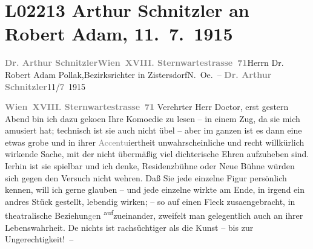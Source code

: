 

\section[Arthur Schnitzler an Robert Adam, 11. 7. 1915]{L02213 Arthur Schnitzler an Robert Adam, 11. 7. 1915}
\nopagebreak{}
\rehead{ }\normalsize\beginnumbering{}
\toendnotes[C]{\smallbreak\pagebreak[2]}
\toendnotes[C]{\smallbreak}\pstart{}{\pb}\textcolor{gray}{\textbf{Dr. Arthur Schnitzler}}\pend{}\pstart{}\textcolor{gray}{\textbf{Wien XVIII. Sternwartestrasse 71}}\pend{}{\bigskip}\pstart{}{\pb}Herrn Dr. Robert Adam Pollak,\pend{}\pstart{}Bezirksrichter in Zistersdorf\pend{}\pstart{}N. Oe. – \pend{}{\bigskip}\vspace{1em}
\pstart
           {\pb}\textcolor{gray}{\textbf{Dr. Arthur Schnitzler}}\hfill 11/7 1915\pend
           
\pstart
           \textcolor{gray}{\textbf{Wien XVIII. Sternwartestrasse 71}}\pend
           \vspace{0.5em}
\pstart
           Verehrter Herr Doctor, erst gestern Abend bin ich dazu geko{\geminationm}en Ihre Komoedie zu lesen – in einem Zug, da sie mich amusiert hat;
               technisch ist sie auch nicht übel – aber im ganzen ist es dann eine etwas grobe und
               in ihrer \textcolor{gray}{Accentu}iertheit unwahrscheinliche und recht willkürlich
               wirkende Sache, mit der nicht übermäßig \introOben{}viel\introOben{} dichterische
               Ehren aufzuheben sind. I{\geminationm}erhin ist sie spielbar und ich
               denke, Residenzbühne oder Neue Bühne würden sich gegen den Versuch nicht wehren. Daß Sie
               jede einzelne Figur persönlich kennen, {\pb}will ich gerne
               glauben – und jede einzelne wirkte am Ende, in irgend ein andres Stück gestellt,
               lebendig wirken; – so auf einen Fleck zusa{\geminationm}engebracht,
               in theatralische Beziehun\textcolor{gray}{ge}n \substVorne{}\textsuperscript{auf}\substDazwischen{}zu\substHinten{}einander, zweifelt man gelegentlich auch an ihrer Lebenswahrheit. De{\geminationn} nichts ist rachsüchtiger als die Kunst – bis zur
               Ungerechtigkeit! –\pend
           
